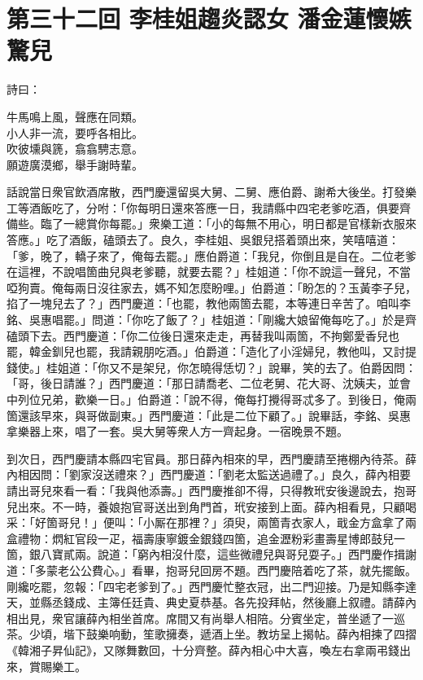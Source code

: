 
\chapter*{第三十二回 李桂姐趨炎認女 潘金蓮懷嫉驚兒}


詩曰：

\begin{myquote}
牛馬鳴上風，聲應在同類。\\小人非一流，要呼各相比。\\吹彼壎與篪，翕翕騁志意。\\願遊廣漠鄉，舉手謝時輩。
\end{myquote}

話說當日衆官飲酒席散，西門慶還留吳大舅、二舅、應伯爵、謝希大後坐。打發樂工等酒飯吃了，分咐：「你每明日還來答應一日，我請縣中四宅老爹吃酒，俱要齊備些。臨了一總賞你每罷。」衆樂工道：「小的每無不用心，明日都是官樣新衣服來答應。」吃了酒飯，磕頭去了。良久，李桂姐、吳銀兒搭着頭出來，笑嘻嘻道：「爹，晚了，轎子來了，俺每去罷。」應伯爵道：「我兒，你倒且是自在。二位老爹在這裡，不說唱箇曲兒與老爹聽，就要去罷？」桂姐道：「你不說這一聲兒，不當啞狗賣。俺每兩日沒往家去，媽不知怎麼盼哩。」伯爵道：「盼怎的？玉黃李子兒，掐了一塊兒去了？」西門慶道：「也罷，教他兩箇去罷，本等連日辛苦了。咱叫李銘、吳惠唱罷。」問道：「你吃了飯了？」桂姐道：「剛纔大娘留俺每吃了。」於是齊磕頭下去。西門慶道：「你二位後日還來走走，再替我叫兩箇，不拘鄭愛香兒也罷，韓金釧兒也罷，我請親朋吃酒。」伯爵道：「造化了小淫婦兒，教他叫，又討提錢使。」桂姐道：「你又不是架兒，你怎曉得恁切？」說畢，笑的去了。伯爵因問：「哥，後日請誰？」西門慶道：「那日請喬老、二位老舅、花大哥、沈姨夫，並會中列位兄弟，歡樂一日。」伯爵道：「說不得，俺每打攪得哥忒多了。到後日，俺兩箇還該早來，與哥做副東。」{}西門慶道：「此是二位下顧了。」說畢話，李銘、吳惠拿樂器上來，唱了一套。吳大舅等衆人方一齊起身。一宿晚景不題。

到次日，西門慶請本縣四宅官員。那日薛內相來的早，西門慶請至捲棚內待茶。薛內相因問：「劉家沒送禮來？」西門慶道：「劉老太監送過禮了。」良久，薛內相要請出哥兒來看一看：「我與他添壽。」西門慶推卻不得，只得教玳安後邊說去，抱哥兒出來。不一時，養娘抱官哥送出到角門首，玳安接到上面。薛內相看見，只顧喝采：「好箇哥兒！」便叫：「小厮在那裡？」須臾，兩箇青衣家人，戢金方盒拿了兩盒禮物：熌紅官段一疋，福壽康寧鍍金銀錢四箇，追金瀝粉彩畫壽星博郎鼓兒一箇，銀八寶貳兩。說道：「窮內相沒什麼，這些微禮兒與哥兒耍子。」西門慶作揖謝道：「多蒙老公公費心。」看畢，抱哥兒回房不題。西門慶陪着吃了茶，就先擺飯。剛纔吃罷，忽報：「四宅老爹到了。」西門慶忙整衣冠，出二門迎接。乃是知縣李達天，並縣丞錢成、主簿任廷貴、典史夏恭基。各先投拜帖，然後廳上叙禮。請薛內相出見，衆官讓薛內相坐首席。席間又有尚舉人相陪。分賓坐定，普坐遞了一巡茶。少頃，堦下鼓樂响動，笙歌擁奏，遞酒上坐。教坊呈上揭帖。薛內相揀了四摺《韓湘子昇仙記》，又隊舞數回，十分齊整。薛內相心中大喜，喚左右拿兩弔錢出來，賞賜樂工。

